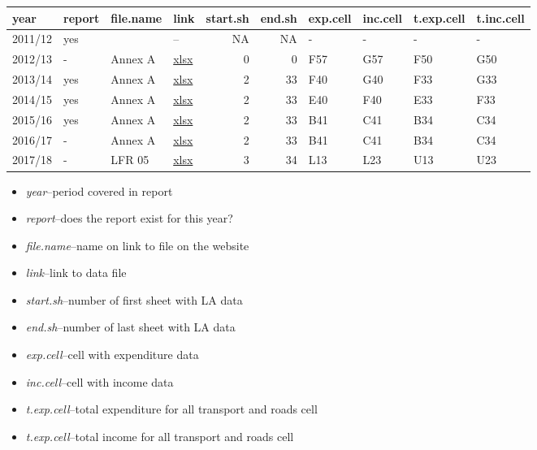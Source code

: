 \documentclass[]{article}
\providecommand{\tightlist}{%
  \setlength{\itemsep}{0pt}\setlength{\parskip}{0pt}}
\begin{document}
\begin{tabular}{llllrrllll}
\toprule
year & report & file.name & link & start.sh & end.sh & exp.cell & inc.cell & t.exp.cell & t.inc.cell\\
\midrule
2011/12 & yes &  & -- & NA & NA & - & - & - & -\\
\cmidrule{1-10}
2012/13 & - & Annex A & \href{https://www2.gov.scot/Resource/0044/00446440.xlsx}{xlsx} & 0 & 0 & F57 & G57 & F50 & G50\\
\cmidrule{1-10}
2013/14 & yes & Annex A & \href{https://www2.gov.scot/Resource/0047/00475683.xlsx}{xlsx} & 2 & 33 & F40 & G40 & F33 & G33\\
\cmidrule{1-10}
2014/15 & yes & Annex A & \href{https://www2.gov.scot/Resource/0049/00494926.xlsx}{xlsx} & 2 & 33 & E40 & F40 & E33 & F33\\
\cmidrule{1-10}
2015/16 & yes & Annex A & \href{https://www2.gov.scot/Resource/0051/00515383.xlsx}{xlsx} & 2 & 33 & B41 & C41 & B34 & C34\\
\cmidrule{1-10}
2016/17 & - & Annex A & \href{https://www2.gov.scot/Resource/0053/00536018.xlsx}{xlsx} & 2 & 33 & B41 & C41 & B34 & C34\\
\cmidrule{1-10}
2017/18 & - & LFR 05 & \href{https://www2.gov.scot/Resource/0054/00546675.xlsx}{xlsx} & 3 & 34 & L13 & L23 & U13 & U23\\
\bottomrule
\end{tabular}

\begin{itemize}
\tightlist
\item
  \emph{year}--period covered in report
\item
  \emph{report}--does the report exist for this year?
\item
  \emph{file.name}--name on link to file on the website
\item
  \emph{link}--link to data file
\item
  \emph{start.sh}--number of first sheet with LA data
\item
  \emph{end.sh}--number of last sheet with LA data
\item
  \emph{exp.cell}--cell with expenditure data
\item
  \emph{inc.cell}--cell with income data
\item
  \emph{t.exp.cell}--total expenditure for all transport and roads cell
\item
  \emph{t.exp.cell}--total income for all transport and roads cell
\end{itemize}
\end{document}
